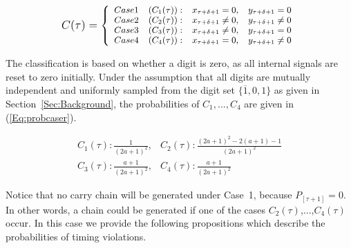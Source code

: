 \documentclass[journal]{IEEEtran}
\begin{document}
\begin{equation}\label{Eq:class}
\footnotesize
    C(\tau)= \left\{ \begin{array}{llll}
        Case 1 & (C_1(\tau)): & x_{\tau +\delta+1}=0, & y_{\tau +\delta+1}=0\\
        Case 2 & (C_2(\tau)): & x_{\tau +\delta+1}\neq 0, & y_{\tau +\delta+1}\neq 0\\
        Case 3 & (C_3(\tau)): & x_{\tau +\delta+1}\neq 0, & y_{\tau +\delta+1}=0\\
        Case 4 & (C_4(\tau)): & x_{\tau +\delta+1}=0, & y_{\tau +\delta+1}\neq 0
\end{array} \right.
\normalsize
\end{equation}

The classification is based on whether a digit is zero, as all internal signals are reset to zero initially. Under the assumption that all digits are mutually independent and uniformly sampled from the digit set  $\{\overline{1},0,1\}$ as given in Section~\ref{Sec:Background}, the probabilities of $C_1,...,C_4$ are given in (\ref{Eq:probcaser}).

\begin{equation}\label{Eq:probcaser}
\begin{array}{ll}
C_1(\tau): \frac{1}{(2a+1)^2}, &  C_2(\tau): \frac{(2a+1)^2-2(a+1)-1}{(2a+1)^2}\\
C_3(\tau):\frac{a+1}{(2a+1)^2}, & C_4(\tau):  \frac{a+1}{(2a+1)^2}
\end{array}
\end{equation}

Notice that no carry chain will be generated under Case~1, because $P_{[\tau+1]}=0$. In other words, a chain could be generated if one of  the cases $C_2(\tau)$,...,$C_4(\tau)$ occur. In this case we provide the following propositions which describe the probabilities of timing violations.
\end{document}
